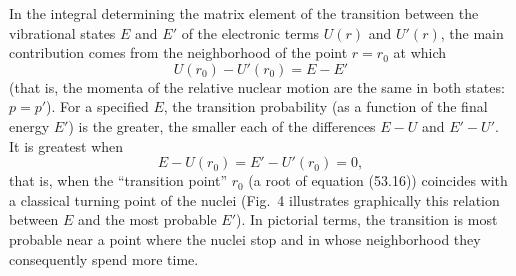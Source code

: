 In the integral determining the matrix element of the transition between the vibrational states $E$ and $E'$ of the electronic terms $U(r)$ and $U'(r)$, the main contribution comes from the neighborhood of the point $r=r_0$ at which
\begin{equation}
U(r_0)-U'(r_0)=E-E'
\tag{53.16}
\end{equation}
(that is, the momenta of the relative nuclear motion are the same in both states: $p=p'$). For a specified $E$, the transition probability (as a function of the final energy $E'$) is the greater, the smaller each of the differences $E-U$ and $E'-U'$. It is greatest when
\begin{equation}
E-U(r_0)=E'-U'(r_0)=0,
\tag{53.17}
\end{equation}
that is, when the ``transition point'' $r_0$ (a root of equation (53.16)) coincides with a classical turning point of the nuclei (Fig.~4 illustrates graphically this relation between $E$ and the most probable $E'$). In pictorial terms, the transition is most probable near a point where the nuclei stop and in whose neighborhood they consequently spend more time.
